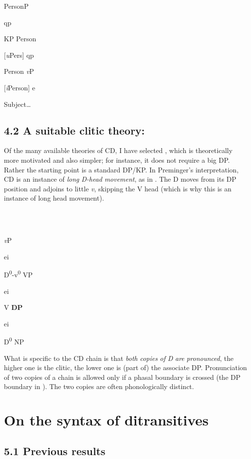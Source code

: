 \documentclass[output=paper,modfonts,nonflat]{langsci/langscibook}
\begin{document}
          PersonP

qp

KP      Person

[\textit{u}Pers]           qp

    Person        \textit{v}P

    [\textit{i}Person]    e

        Subject…

\subsection{\textbf{4.2} \textbf{A} \textbf{suitable} \textbf{clitic} \textbf{theory:} \textbf{\citealt{Preminger2016}} }

Of the many available theories of CD, I have selected \citet{Preminger2016}, which is theoretically more motivated and also simpler; for instance, it does not require a big DP. Rather the starting point is a standard DP/KP. In Preminger’s interpretation, CD is an instance of \textit{long} \textit{D-head} \textit{movement}, as in . The D moves from its DP position and adjoins to little \textit{v}, skipping the V head (which is why this is an instance of long head movement).

\ea%
    \label{ex:key:30}
    \gll\\
        \\
    \glt
    \z

            \textit{v}P

   ei

  D\textsuperscript{0}{}-v\textsuperscript{0}    VP

    ei

    V    \textbf{DP}

      ei

      D\textsuperscript{0}    NP

What is specific to the CD chain is that \textit{both} \textit{copies} \textit{of} \textit{D} \textit{are} \textit{pronounced}, the higher one is the clitic, the lower one is (part of) the associate DP. Pronunciation of two copies of a chain is allowed only if a phasal boundary is crossed (the DP boundary in ). The two copies are often phonologically distinct. 

\section{On the syntax of ditransitives} %

\subsection{\textbf{5.1} \textbf{Previous} \textbf{results}}
\end{document}
